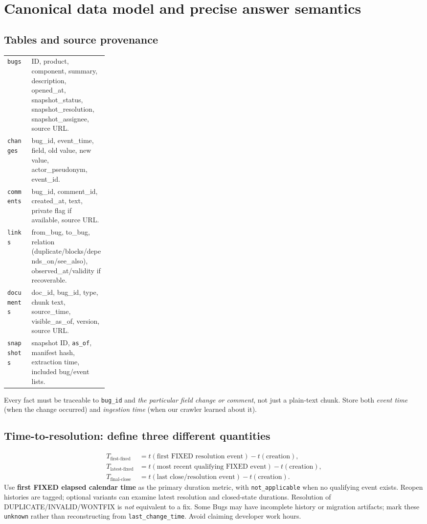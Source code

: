 \documentclass[11pt,a4paper]{article}
\begin{document}
\section{Canonical data model and precise answer semantics}
\subsection{Tables and source provenance}
\begin{tabularx}{\linewidth}{@{}p{0.24\linewidth}X@{}}\toprule
\texttt{bugs} & ID, product, component, summary, description, opened\_at, snapshot\_status, snapshot\_resolution, snapshot\_assignee, source URL.\\
\texttt{changes} & bug\_id, event\_time, field, old value, new value, actor\_pseudonym, event\_id.\\
\texttt{comments} & bug\_id, comment\_id, created\_at, text, private flag if available, source URL.\\
\texttt{links} & from\_bug, to\_bug, relation (duplicate/blocks/depends\_on/see\_also), observed\_at/validity if recoverable.\\
\texttt{documents} & doc\_id, bug\_id, type, chunk text, source\_time, visible\_as\_of, version, source URL.\\
\texttt{snapshots} & snapshot ID, \texttt{as\_of}, manifest hash, extraction time, included bug/event lists.\\\bottomrule
\end{tabularx}

Every fact must be traceable to \texttt{bug\_id} and \emph{the particular field change or comment}, not just a plain-text chunk. Store both \emph{event time} (when the change occurred) and \emph{ingestion time} (when our crawler learned about it).

\subsection{Time-to-resolution: define three different quantities}
\begin{align*}
T_{\text{first-fixed}} &= t(\text{first FIXED resolution event})-t(\text{creation}),\\
T_{\text{latest-fixed}} &= t(\text{most recent qualifying FIXED event})-t(\text{creation}),\\
T_{\text{final-close}} &= t(\text{last close/resolution event})-t(\text{creation}).
\end{align*}
Use \textbf{first FIXED elapsed calendar time} as the primary duration metric, with \texttt{not\_applicable} when no qualifying event exists. Reopen histories are tagged; optional variants can examine latest resolution and closed-state durations. Resolution of DUPLICATE/INVALID/WONTFIX is \emph{not} equivalent to a fix. Some Bugs may have incomplete history or migration artifacts; mark these \texttt{unknown} rather than reconstructing from \texttt{last\_change\_time}. Avoid claiming developer work hours.
\end{document}
